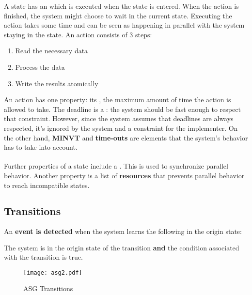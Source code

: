 \documentclass[../main.tex]{subfiles}
\begin{document}
A state has an  which is executed when the state is entered.
When the action is finished, the system might choose to wait in the current state.
Executing the action takes some time and can be seen as happening in parallel with the system staying in the state.
An action consists of 3 steps:
\begin{enumerate}
	\item Read the necessary data
	\item Process the data
	\item Write the results atomically
\end{enumerate}
An action has one property: its , the maximum amount of time the action is allowed to take.
The deadline is a : the system should be fast enough to respect that constraint.
However, since the system assumes that deadlines are always respected, it's ignored by the system and a constraint for the implementer.
On the other hand, \textbf{MINVT} and \textbf{time-outs} are elements that the system's behavior has to take into account.
\\\\
Further properties of a state include a .
This is used to synchronize parallel behavior.
Another property is a list of \textbf{resources} that  prevents parallel behavior to reach incompatible states.

\subsection{Transitions}
\begin{defn}
An \textbf{event is detected} when the system learns the following in the origin state:
\begin{center}
The system is in the origin state of the transition \textbf{and} the condition associated with the transition is true.
\end{center}
\end{defn}

\begin{figure}[H]
    \centering
    \texttt{[image: asg2.pdf]}
    \caption{ASG Transitions}
    \label{asg2}
\end{figure}
\end{document}
